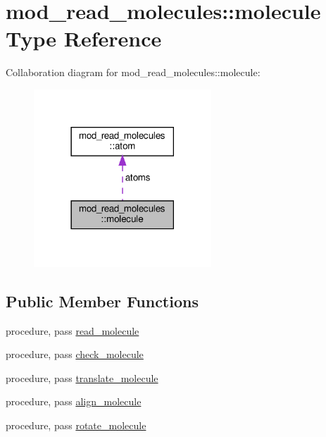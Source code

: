 \hypertarget{structmod__read__molecules_1_1molecule}{}\section{mod\+\_\+read\+\_\+molecules\+:\+:molecule Type Reference}
\label{structmod__read__molecules_1_1molecule}


Collaboration diagram for mod\+\_\+read\+\_\+molecules\+:\+:molecule\+:
\nopagebreak
\begin{figure}[H]
\begin{center}
\leavevmode
\includegraphics[width=189pt]{structmod__read__molecules_1_1molecule__coll__graph}
\end{center}
\end{figure}
\subsection*{Public Member Functions}
\begin{DoxyCompactItemize}
\item 
procedure, pass \hyperlink{structmod__read__molecules_1_1molecule_aeadc8847066573d8a4c1ffc6099e2848}{read\+\_\+molecule}
\item 
procedure, pass \hyperlink{structmod__read__molecules_1_1molecule_ab9159e0c475e1db758ee9dd62d8f4e94}{check\+\_\+molecule}
\item 
procedure, pass \hyperlink{structmod__read__molecules_1_1molecule_a053396d1f476f293e513724be4e6d87e}{translate\+\_\+molecule}
\item 
procedure, pass \hyperlink{structmod__read__molecules_1_1molecule_a5ba3ca5b80fdf1558f4e69006ec0d0b2}{align\+\_\+molecule}
\item 
procedure, pass \hyperlink{structmod__read__molecules_1_1molecule_aa4bf3773f61ebebe42477d481d3cbf7e}{rotate\+\_\+molecule}
\end{DoxyCompactItemize}
